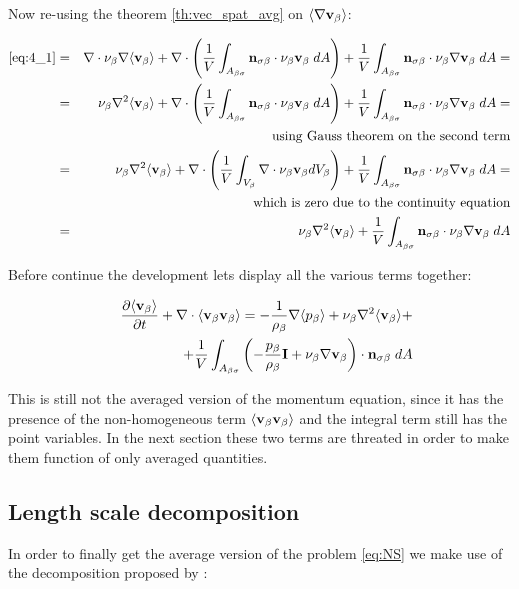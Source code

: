 Now re-using the theorem \ref{th:vec_spat_avg} on ${\left< \nabla \textbf{v}_{\beta} \right>}$:

\begin{eqnarray}
	\eqref{eq:4_1} &=& \nabla \cdot \nu_{\beta} \nabla {\left< \textbf{v}_{\beta}\right>} + \nabla \cdot \left( \dfrac{1}{V} \int_{A_{\beta \sigma}} \mathbf{n}_{\sigma \beta} \cdot \nu_{\beta} \textbf{v}_{\beta} \;dA \right) + \dfrac{1}{V} \int_{A_{\beta \sigma}} \mathbf{n}_{\sigma \beta} \cdot \nu_{\beta} \nabla \textbf{v}_{\beta} \;dA = \nonumber \\
	&=& \nu_{\beta}\nabla^2 {\left< \textbf{v}_{\beta} \right>} +  \nabla \cdot \left( \dfrac{1}{V} \int_{A_{\beta \sigma}} \mathbf{n}_{\sigma \beta} \cdot \nu_{\beta} \textbf{v}_{\beta} \;dA \right) + \dfrac{1}{V} \int_{A_{\beta \sigma}} \mathbf{n}_{\sigma \beta} \cdot \nu_{\beta} \nabla \textbf{v}_{\beta} \;dA  = \nonumber \\
	&& \text{using Gauss theorem on the second term} \nonumber \\
	&=& \nu_{\beta}\nabla^2 {\left< \textbf{v}_{\beta} \right>} +  \nabla \cdot \left( \dfrac{1}{V} \int_{V_\beta} \nabla \cdot \nu_{\beta} \textbf{v}_{\beta} dV_\beta \right) + \dfrac{1}{V} \int_{A_{\beta \sigma}} \mathbf{n}_{\sigma \beta} \cdot \nu_{\beta} \nabla \textbf{v}_{\beta} \;dA = \nonumber \\
	&& \text{which is zero due to the continuity equation} \nonumber \\
	&=& \nu_{\beta}\nabla^2 {\left< \textbf{v}_{\beta} \right>} + \dfrac{1}{V} \int_{A_{\beta \sigma}} \mathbf{n}_{\sigma \beta} \cdot \nu_{\beta} \nabla \textbf{v}_{\beta} \;dA
\end{eqnarray}


Before continue the development lets display all the various terms together:

\begin{eqnarray}
&& \dfrac{\partial {\left< \textbf{v}_{\beta}\right>}}{\partial t} + \nabla \cdot {\left< \textbf{v}_{\beta}\textbf{v}_{\beta}\right>} = -\dfrac{1}{\rho_{\beta}} \nabla {\left< p_{\beta}\right>} + \nu_{\beta}\nabla^2 {\left< \textbf{v}_{\beta} \right>} + \nonumber \\
&& +\dfrac{1}{V} \int_{A_{\beta \sigma}} \left( -\dfrac{p_{\beta}}{\rho_{\beta}} \mathbf{I} + \nu_{\beta} \nabla \textbf{v}_{\beta}  \right)\cdot \mathbf{n}_{\sigma \beta} \;dA \nonumber \\
\label{eq:mom_2}
\end{eqnarray}

This is still not the averaged version of the momentum equation, since it has the presence of the non-homogeneous term ${\left< \textbf{v}_{\beta}\textbf{v}_{\beta} \right>}$ and the integral term still has the point variables.
In the next section these two terms are threated in order to make them function of only averaged quantities.

\subsection{Length scale decomposition}
In order to finally get the average version of the problem \eqref{eq:NS} we make use of the decomposition proposed by \citet{gray1975derivation}:


